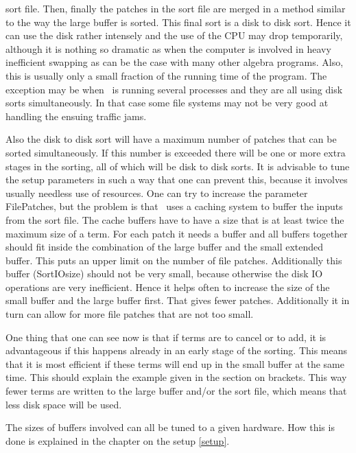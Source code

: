 sort file. Then, finally the patches in the sort file are merged in a 
method similar to the way the large buffer is sorted. This final sort is a 
disk to disk sort. Hence it can use the disk 
rather intensely and the use of the CPU may drop temporarily, although it 
is nothing so dramatic as when the computer is involved in heavy 
inefficient swapping as can be the case with many other algebra programs. 
Also, this is usually only a small fraction of the running time of the 
program. The exception may be when \FORM\ is running several processes and 
they are all using disk sorts simultaneously. In that case some file 
systems may not be very good at handling the ensuing
traffic jams.

Also the disk to disk sort will have a maximum number of patches that can 
be sorted simultaneously. If this number is exceeded there will be one or 
more extra stages in the sorting, all of which 
will be disk to disk sorts. It is advisable to tune the setup parameters in 
such a way that one can prevent this, because it involves usually needless 
use of resources. One can try to increase the parameter 
FilePatches, but the problem is that \FORM\ uses a 
caching system to buffer the inputs from the sort file. The 
cache buffers have to have a size that is at least twice the maximum size 
of a term. For each patch it needs a buffer and all buffers together should 
fit inside the combination of the large buffer and the small extended 
buffer. This puts an upper limit on the number of file patches. 
Additionally this buffer (SortIOsize) should not be very 
small, because otherwise the disk IO operations are very inefficient. Hence 
it helps often to increase the size of the small buffer and the large 
buffer first. That gives fewer patches. Additionally it in turn can allow 
for more file patches that are not too small.

One thing that one can see now is that if terms are to cancel or to add, it 
is advantageous if this happens already in an early stage of the sorting. 
This means that it is most efficient if these terms will end up in the 
small buffer at the same time. This should explain the example given in the 
section on brackets. This way fewer terms are written to 
the large buffer and/or the sort file, which means that less disk space 
will be used.

The sizes of buffers involved can all be tuned to a given hardware. How 
this is done is explained in the chapter on the setup \ref{setup}.


